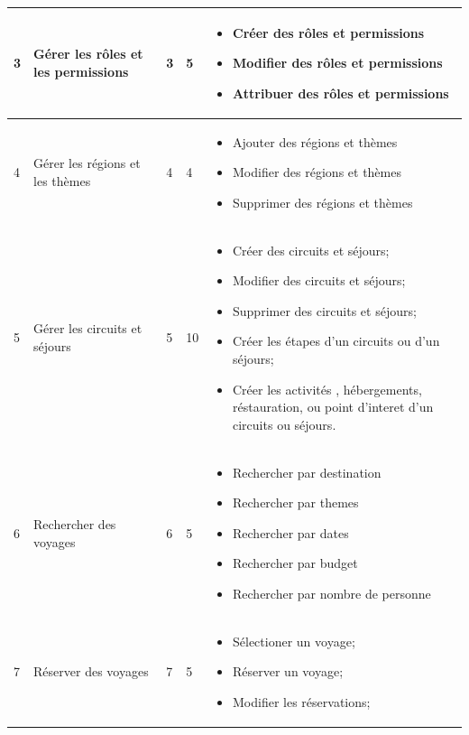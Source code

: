 \documentclass[12pt]{report}
\begin{document}
\begin{longtable}{|p{1cm}|p{3cm}|p{2cm}|p{2cm}|p{6cm}|}
						\hline
						 3&Gérer les rôles et les permissions&3&5&
						\begin{itemize}
							\item Créer des rôles et permissions
							 \item Modifier des rôles et permissions
							 \item Attribuer des rôles et permissions
						\end{itemize}
						\\
						\hline
						 4&Gérer les régions et les thèmes&4&4&
						\begin{itemize}
							\item Ajouter des régions et thèmes
							\item	Modifier des régions et thèmes						
							\item Supprimer des régions et thèmes
						\end{itemize}
						\\
						\hline
						 5&Gérer les circuits et séjours&5&10&
						\begin{itemize}
							\item Créer des circuits et séjours;
							\item Modifier des circuits et séjours;
							\item Supprimer des circuits et séjours;
							\item Créer les étapes d'un circuits ou d'un séjours;
							\item Créer les activités , hébergements, réstauration, ou point d'interet d'un circuits ou séjours.
						\end{itemize}
						\\
						\hline
						 6&Rechercher des voyages&6&5&
						\begin{itemize}
							\item Rechercher par destination
							\item Rechercher par themes
							\item Rechercher par dates
							\item Rechercher par budget
							\item Rechercher par nombre de personne
						\end{itemize}
						\\
						\hline
						 7&Réserver des voyages&7&5&
						\begin{itemize}
							\item Sélectioner un voyage;
							\item Réserver un voyage;
							\item Modifier les réservations;

\end{itemize}
\end{longtable}
\end{document}
